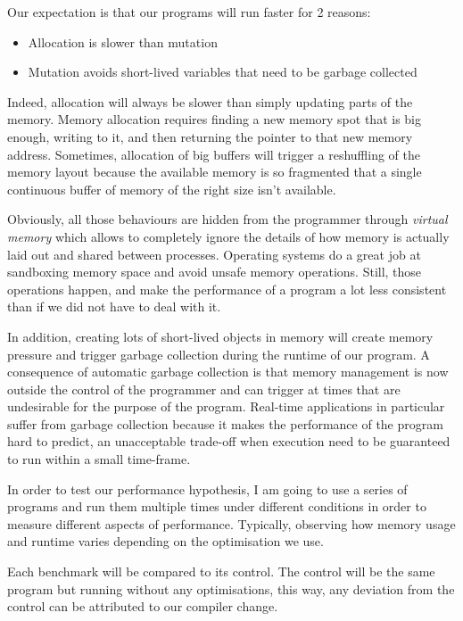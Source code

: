\documentclass[
]{article}
\providecommand{\tightlist}{%
  \setlength{\itemsep}{0pt}\setlength{\parskip}{0pt}}
\begin{document}
Our expectation is that our programs will run faster for 2 reasons:

\begin{itemize}
\tightlist
\item
  Allocation is slower than mutation
\item
  Mutation avoids short-lived variables that need to be garbage
  collected
\end{itemize}

Indeed, allocation will always be slower than simply updating parts of
the memory. Memory allocation requires finding a new memory spot that is
big enough, writing to it, and then returning the pointer to that new
memory address. Sometimes, allocation of big buffers will trigger a
reshuffling of the memory layout because the available memory is so
fragmented that a single continuous buffer of memory of the right size
isn't available.

Obviously, all those behaviours are hidden from the programmer through
\emph{virtual memory} which allows to completely ignore the details of
how memory is actually laid out and shared between processes. Operating
systems do a great job at sandboxing memory space and avoid unsafe
memory operations. Still, those operations happen, and make the
performance of a program a lot less consistent than if we did not have
to deal with it.

In addition, creating lots of short-lived objects in memory will create
memory pressure and trigger garbage collection during the runtime of our
program. A consequence of automatic garbage collection is that memory
management is now outside the control of the programmer and can trigger
at times that are undesirable for the purpose of the program. Real-time
applications in particular suffer from garbage collection because it
makes the performance of the program hard to predict, an unacceptable
trade-off when execution need to be guaranteed to run within a small
time-frame.

In order to test our performance hypothesis, I am going to use a series
of programs and run them multiple times under different conditions in
order to measure different aspects of performance. Typically, observing
how memory usage and runtime varies depending on the optimisation we
use.

Each benchmark will be compared to its control. The control will be the
same program but running without any optimisations, this way, any
deviation from the control can be attributed to our compiler change.
\end{document}
